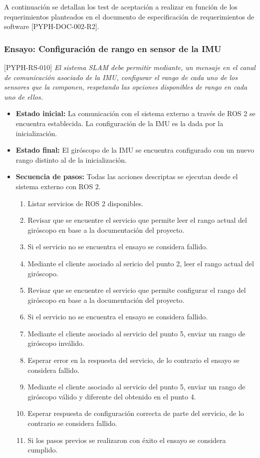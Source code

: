 \documentclass[
11pt, %
codirector, %
]{simple_charter}
\begin{document}
A continuación se detallan los test de aceptación a realizar en función de los requerimientos
planteados en el documento de especificación de requerimientos de software [PYPH-DOC-002-R2].

\subsubsection{Ensayo: Configuración de rango en sensor de la IMU}
\label{sssec:ensayo-configuracion-de-rango-en-sensor-de-la-imu}

[PYPH-RS-010] \textit{El sistema SLAM debe permitir mediante, un mensaje en el canal de comunicación
asociado de la IMU, configurar el rango de cada uno de los sensores que la componen, respetando las
opciones disponibles de rango en cada uno de ellos.}

\begin{itemize}
	\item \textbf{Estado inicial:} La comunicación con el sistema externo a través de ROS 2 se
	encuentra establecida. La configuración de la IMU es la dada por la inicialización.
	\item \textbf{Estado final:} El giróscopo de la IMU se encuentra configurado con un nuevo rango
	distinto al de la inicialización.
	\item \textbf{Secuencia de pasos:} Todas las acciones descriptas se ejecutan desde el sistema
	externo con ROS 2.
	\begin{enumerate}
		\item Listar servicios de ROS 2 disponibles.
		\item Revisar que se encuentre el servicio que permite leer el rango actual del giróscopo
		en base a la documentación del proyecto.
		\item Si el servicio no se encuentra el ensayo se considera fallido.
		\item Mediante el cliente asociado al sericio del punto 2, leer el rango actual del
		giróscopo.
		\item Revisar que se encuentre el servicio que permite configurar el rango del giróscopo
		en base a la documentación del proyecto.
		\item Si el servicio no se encuentra el ensayo se considera fallido.
		\item Mediante el cliente asociado al servicio del punto 5, enviar un rango de giróscopo
		inválido.
		\item Esperar error en la respuesta del servicio, de lo contrario el ensayo se considera
		fallido.
		\item Mediante el cliente asociado al servicio del punto 5, enviar un rango de giróscopo
		válido y diferente del obtenido en el punto 4.
		\item Esperar respuesta de configuración correcta de parte del servicio, de lo contrario se
		considera fallido.
		\item Si los pasos previos se realizaron con éxito el ensayo se considera cumplido.
	\end{enumerate}
\end{itemize}
\end{document}
